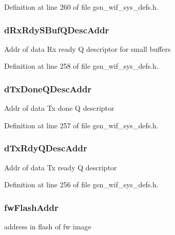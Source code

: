 Definition at line 260 of file gsn\_\-wif\_\-sys\_\-defs.h.

\hypertarget{a00348_ab547f820597f1b1f7cbfdd7393569c12}{
\subsubsection[{dRxRdySBufQDescAddr}]{ {\bf dRxRdySBufQDescAddr}}}
\label{a00348_ab547f820597f1b1f7cbfdd7393569c12}
Addr of data Rx ready Q descriptor for small buffers 

Definition at line 258 of file gsn\_\-wif\_\-sys\_\-defs.h.

\hypertarget{a00348_a78d96dc01c76349b87f960ba482cac23}{
\subsubsection[{dTxDoneQDescAddr}]{ {\bf dTxDoneQDescAddr}}}
\label{a00348_a78d96dc01c76349b87f960ba482cac23}
Addr of data Tx done Q descriptor 

Definition at line 257 of file gsn\_\-wif\_\-sys\_\-defs.h.

\hypertarget{a00348_a2e68778dde03015909b732c4e317c01f}{
\subsubsection[{dTxRdyQDescAddr}]{ {\bf dTxRdyQDescAddr}}}
\label{a00348_a2e68778dde03015909b732c4e317c01f}
Addr of data Tx ready Q descriptor 

Definition at line 256 of file gsn\_\-wif\_\-sys\_\-defs.h.

\hypertarget{a00348_a227fcb5ac22283fc4d90e07a8363f7a5}{
\subsubsection[{fwFlashAddr}]{ {\bf fwFlashAddr}}}
\label{a00348_a227fcb5ac22283fc4d90e07a8363f7a5}
address in flash of fw image 

